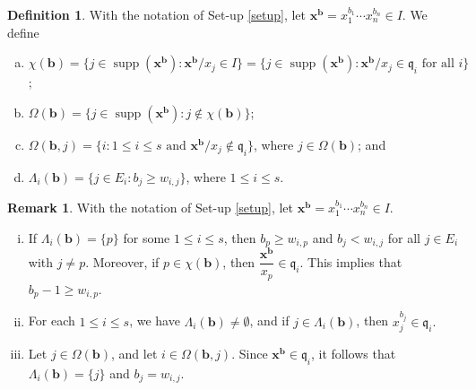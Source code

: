 \documentclass[12pt,reqno]{amsart}
\theoremstyle{definition}
\newtheorem{defn}[thm]{Definition}
\newtheorem{remark}[thm]{Remark}
\newcommand{\q}{\mathfrak{q}}
\newcommand{\x}{\mathbf{x}}
\newcommand{\bb}{\mathbf{b}}
\newcommand{\C}{\chi}
\newcommand{\Om}{\Omega}
\newcommand{\Lm}{\Lambda}
\newcommand{\supp}[1]{\operatorname{supp}\left(#1\right)}
\numberwithin{equation}{section}
\begin{document}
\begin{defn}
    With the notation of Set-up \ref{setup}, let $\x^{\bb} = x_1^{b_1} \cdots x_n^{b_n} \in I.$ We define
    \begin{enumerate}[(a)]
        \item $\C(\bb) = \{j \in \supp{\x^{\bb}} : \x^{\bb} / x_j \in I\} = \{j \in \supp{\x^{\bb}} : \x^{\bb} / x_j \in \q_i \text{ for all } i\}$; 

        \vspace{2mm}

        \item $\Om(\bb) = \{j \in \supp{\x^{\bb}} : j \notin \C(\bb)\}$;

        \vspace{2mm}

        \item $\Om(\bb, j) = \{i : 1 \le i \le s \text{ and } \x^{\bb} / x_j \notin \q_i\}$, where $j \in \Om(\bb)$; and

        \vspace{2mm}

        \item $\Lm_i(\bb) = \{j \in E_i : b_j \ge w_{i, j}\}$, where $1 \le i \le s.$
    \end{enumerate}
\end{defn}

\begin{remark}\label{R-MonomialOfI}
    With the notation of Set-up \ref{setup}, let $\x^{\bb} = x_1^{b_1} \cdots x_n^{b_n} \in I.$
    \begin{enumerate}[(i)]
        \item If $\Lm_i(\bb) = \{p\}$ for some $1 \le i \le s$, then $b_p \ge w_{i, p}$ and $b_j < w_{i, j}$ for all $j \in E_i$ with $j \ne p.$ Moreover, if $p \in \C({\bb})$, then $\dfrac{\x^{\bb}}{x_p} \in \q_i.$ This implies that $b_p - 1 \ge w_{i, p}.$
        
        \item For each $1 \le i \le s$, we have $\Lm_i(\bb) \ne \emptyset$, and if $j \in \Lm_i(\bb)$, then $x_j^{b_j} \in \q_i.$ 
        
        \item Let $j \in \Om(\bb)$, and let $i \in \Om(\bb, j).$ Since $\x^{\bb} \in \q_i$, it follows that $\Lm_i(\bb) = \{j\}$ and $b_j = w_{i, j}.$
    \end{enumerate}
\end{remark}
\end{document}
